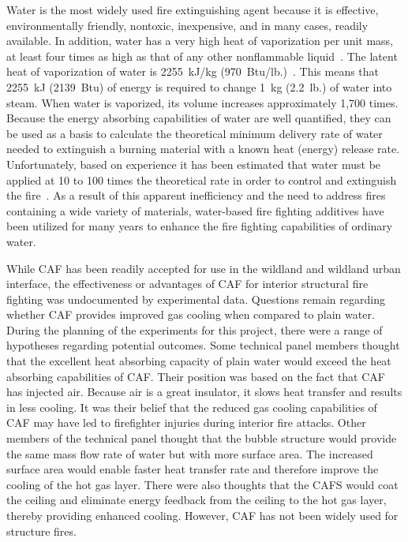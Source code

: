 \documentclass[12pt,oneside]{book}
\begin{document}
Water is the most widely used fire extinguishing agent because it is effective, environmentally friendly, nontoxic, inexpensive, and in many cases, readily available. In addition, water has a very high heat of vaporization per unit mass, at least four times as high as that of any other nonflammable liquid~\cite{NFPA}. The latent heat of vaporization of water is 2255~kJ/kg (970~Btu/lb.)~\cite{NFPA}. This means that 2255~kJ (2139~Btu) of energy is required to change 1~kg (2.2~lb.) of water into steam. When water is vaporized, its volume increases approximately 1,700 times. Because the energy absorbing capabilities of water are well quantified, they can be used as a basis to calculate the theoretical minimum delivery rate of water needed to extinguish a burning material with a known heat (energy) release rate. Unfortunately, based on experience it has been estimated that water must be applied at 10 to 100 times the theoretical rate in order to control and extinguish the fire~\cite{Friedman:2}. As a result of this apparent inefficiency and the need to address fires containing a wide variety of materials, water-based fire fighting additives have been utilized for many years to enhance the fire fighting capabilities of ordinary water.

While CAF has been readily accepted for use in the wildland and wildland urban interface, the effectiveness or advantages of CAF for interior structural fire fighting was undocumented by experimental data. Questions remain regarding whether CAF provides improved gas cooling when compared to plain water. During the planning of the experiments for this project, there were a range of hypotheses regarding potential outcomes. Some technical panel members thought that the excellent heat absorbing capacity of plain water would exceed the heat absorbing capabilities of CAF. Their position was based on the fact that CAF has injected air. Because air is a great insulator, it slows heat transfer and results in less cooling. It was their belief that the reduced gas cooling capabilities of CAF may have led to firefighter injuries during interior fire attacks. Other members of the technical panel thought that the bubble structure would provide the same mass flow rate of water but with more surface area. The increased surface area would enable faster heat transfer rate and therefore improve the cooling of the hot gas layer. There were also thoughts that the CAFS would coat the ceiling and eliminate energy feedback from the ceiling to the hot gas layer, thereby providing enhanced cooling. However, CAF has not been widely used for structure fires.
\end{document}
